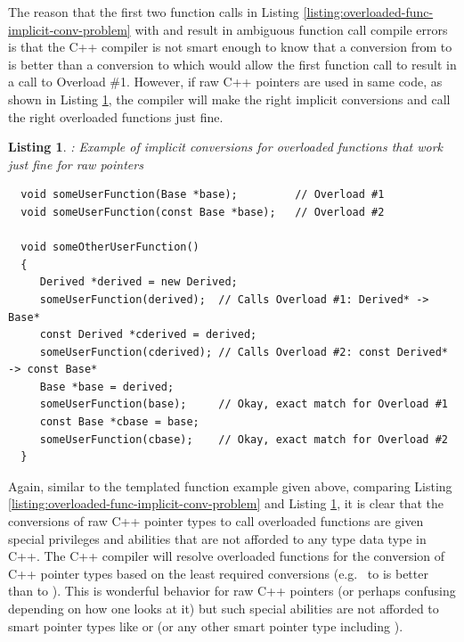 \documentclass[pdf,ps2pdf,11pt]{SANDreport}
\newtheorem{listing}{Listing}
\begin{document}
The reason that the first two function calls in Listing
{}\ref{listing:overloaded-func-implicit-conv-problem} with
{} and {} result in
ambiguous function call compile errors is that the C++ compiler is not
smart enough to know that a conversion from {} to
{} is better than a conversion to {} which would allow the first function call to result in a call
to Overload \#1.  However, if raw C++ pointers are used in same code,
as shown in Listing
{}\ref{listing:overloaded-func-implicit-conv-raw-pass}, the compiler
will make the right implicit conversions and call the right overloaded
functions just fine.


{}\begin{listing}: Example of implicit conversions for overloaded
functions that work just fine for raw pointers
\label{listing:overloaded-func-implicit-conv-raw-pass}
{\small\begin{verbatim}
  void someUserFunction(Base *base);         // Overload #1
  void someUserFunction(const Base *base);   // Overload #2

  void someOtherUserFunction()
  {
     Derived *derived = new Derived;
     someUserFunction(derived);  // Calls Overload #1: Derived* -> Base*
     const Derived *cderived = derived;
     someUserFunction(cderived); // Calls Overload #2: const Derived* -> const Base*
     Base *base = derived;
     someUserFunction(base);     // Okay, exact match for Overload #1
     const Base *cbase = base;
     someUserFunction(cbase);    // Okay, exact match for Overload #2
  }
\end{verbatim}}
\end{listing}


Again, similar to the templated function example given above,
comparing Listing
{}\ref{listing:overloaded-func-implicit-conv-problem} and Listing
{}\ref{listing:overloaded-func-implicit-conv-raw-pass}, it is clear
that the conversions of raw C++ pointer types to call overloaded
functions are given special privileges and abilities that are not
afforded to any type data type in C++.  The C++ compiler will resolve
overloaded functions for the conversion of C++ pointer types based on
the least required conversions (e.g.\ {} to
{} is better than {} to {}).
This is wonderful behavior for raw C++ pointers (or perhaps confusing
depending on how one looks at it) but such special abilities are not
afforded to smart pointer types like {} or {} (or
any other smart pointer type including {}).
\end{document}
